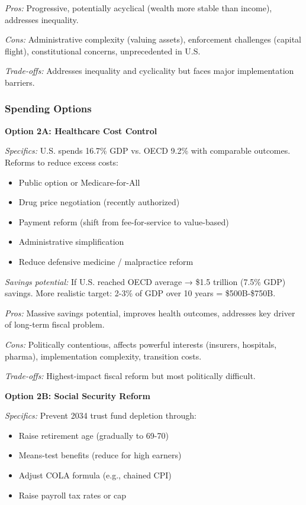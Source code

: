 \documentclass[12pt,letterpaper]{article}
\begin{document}
\textit{Pros:} Progressive, potentially acyclical (wealth more stable than income), addresses inequality.

\textit{Cons:} Administrative complexity (valuing assets), enforcement challenges (capital flight), constitutional concerns, unprecedented in U.S.

\textit{Trade-offs:} Addresses inequality and cyclicality but faces major implementation barriers.

\subsubsection{Spending Options}

\textbf{Option 2A: Healthcare Cost Control}

\textit{Specifics:} U.S. spends 16.7\% GDP vs. OECD 9.2\% with comparable outcomes. Reforms to reduce excess costs:
\begin{itemize}
    \item Public option or Medicare-for-All
    \item Drug price negotiation (recently authorized)
    \item Payment reform (shift from fee-for-service to value-based)
    \item Administrative simplification
    \item Reduce defensive medicine / malpractice reform
\end{itemize}

\textit{Savings potential:} If U.S. reached OECD average → \$1.5 trillion (7.5\% GDP) savings. More realistic target: 2-3\% of GDP over 10 years = \$500B-\$750B.

\textit{Pros:} Massive savings potential, improves health outcomes, addresses key driver of long-term fiscal problem.

\textit{Cons:} Politically contentious, affects powerful interests (insurers, hospitals, pharma), implementation complexity, transition costs.

\textit{Trade-offs:} Highest-impact fiscal reform but most politically difficult.

\textbf{Option 2B: Social Security Reform}

\textit{Specifics:} Prevent 2034 trust fund depletion through:
\begin{itemize}
    \item Raise retirement age (gradually to 69-70)
    \item Means-test benefits (reduce for high earners)
    \item Adjust COLA formula (e.g., chained CPI)
    \item Raise payroll tax rates or cap
\end{itemize}
\end{document}
